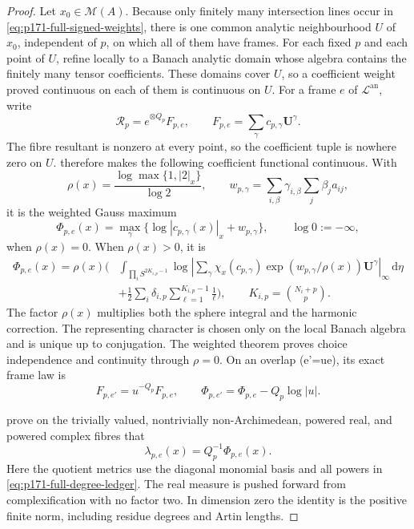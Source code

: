 \begin{proof}
Let \(x_0\in\mathcal M(A)\).  Because only finitely many intersection
lines occur in \eqref{eq:p171-full-signed-weights}, there is one common
analytic neighbourhood \(U\) of \(x_0\), independent of \(p\), on which
all of them have frames.  For each fixed \(p\) and each point of \(U\),
refine locally to a Banach analytic domain whose algebra contains the
finitely many tensor coefficients.  These domains cover \(U\), so a
coefficient weight proved continuous on each of them is continuous on
\(U\).  For a frame \(e\) of \(\mathscr L^{\mathrm{an}}\), write
\[
 \mathcal R_p=e^{\otimes Q_p}F_{p,e},
 \qquad
 F_{p,e}=\sum_\gamma c_{p,\gamma}\mathbf U^\gamma.
\]
The fibre resultant is nonzero at every point, so the coefficient tuple is
nowhere zero on \(U\).
 therefore makes the following
coefficient functional continuous.  With
\[
 \rho(x)=\frac{\log\max\{1,|2|_x\}}{\log2},
 \qquad
 w_{p,\gamma}=\sum_{i,\beta}
       \gamma_{i,\beta}\sum_j\beta_ja_{ij},
\]
it is the weighted Gauss maximum
\[
 \Phi_{p,e}(x)=
 \max_\gamma\{\log|c_{p,\gamma}(x)|_x+w_{p,\gamma}\},
 \qquad \log0:=-\infty,
\]
when \(\rho(x)=0\).  When \(\rho(x)>0\), it is
\begin{align*}
 \Phi_{p,e}(x)=\rho(x)\Bigg(&
 \int_{\prod_iS^{2K_{i,p}-1}}
 \log\left|
  \sum_\gamma\chi_x(c_{p,\gamma})
  \exp(w_{p,\gamma}/\rho(x))\mathbf U^\gamma
 \right|_\infty\,\mathrm d\eta\\
 &+\frac12\sum_i\delta_{i,p}
    \sum_{\ell=1}^{K_{i,p}-1}\frac1\ell\Bigg),
 \qquad K_{i,p}=\binom{N_i+p}{p}.
\end{align*}
The factor \(\rho(x)\) multiplies both the sphere integral and the
harmonic correction.  The representing character is chosen only on the
local Banach algebra and is unique up to conjugation.  The weighted theorem
proves choice independence and continuity through \(\rho=0\).  On an
overlap (e'=ue), its exact frame law is
\begin{equation}
 F_{p,e'}=u^{-Q_p}F_{p,e},
 \qquad
 \Phi_{p,e'}=\Phi_{p,e}-Q_p\log|u|.
 \label{eq:p171-full-frame-law}
\end{equation}

prove on the
trivially valued, nontrivially non-Archimedean, powered real, and powered
complex fibres that
\begin{equation}
 \lambda_{p,e}(x)=Q_p^{-1}\Phi_{p,e}(x).
 \label{eq:p171-full-module-c-identity}
\end{equation}
Here the quotient metrics use the diagonal monomial basis and all powers in
\eqref{eq:p171-full-degree-ledger}.  The real measure is pushed forward
from complexification with no factor two.  In dimension zero the identity
is the positive finite norm, including residue degrees and Artin lengths.


\end{proof}
